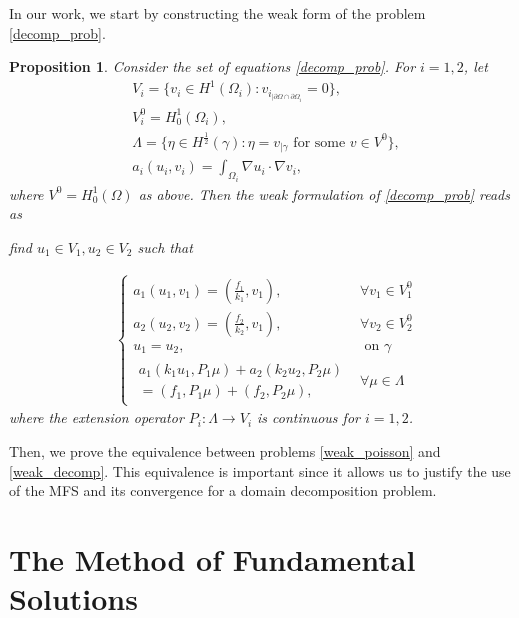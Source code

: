 \documentclass[5p,authoryear]{elsarticle}
\newtheorem{proposition}[theorem]{Proposition}
\begin{document}
In our work, we start by constructing the weak form of the problem \eqref{decomp_prob}.
\begin{proposition}
    Consider the set of equations \eqref{decomp_prob}. For \(i=1, 2\), let
    \begin{align*}
        &V_i = \{v_i \in H^1(\Omega_i): v_{i_{|\partial \Omega \cap \partial {\Omega_i}}}=0\},\\
        &V_i^0 = H^1_0(\Omega_i),\\
        &\Lambda = \{\eta \in H^\frac{1}{2}(\gamma): \eta = v_{|\gamma} \text{ for some } v \in V^0\}, \\
        &a_i (u_i, v_i) = \int_{\Omega_i} \nabla u_i \cdot \nabla v_i,
    \end{align*}
    where \(V^0 = H^1_0(\Omega)\) as above.
    Then the weak formulation of \eqref{decomp_prob} reads as
    \begin{center}
        \textit{find} \(u_1\in V_1, u_2 \in V_2\) \textit{such that}
    \end{center}
    \begin{equation}\label{weak_decomp}
        \begin{aligned}
            &\begin{cases}
                a_1(u_1, v_1) = (\frac{f_1}{k_1}, v_1), & \forall v_1 \in V_1^0\\
                a_2(u_2, v_2) = (\frac{f_2}{k_2}, v_1), & \forall v_2 \in V_2^0\\
                u_1 = u_2, & \text{ on } \gamma\\
                \begin{aligned}
                a_1(k_1 u_1, P_1 \mu) + a_2(k_2 u_2, P_2 \mu) \\[0.2cm] = (f_1, P_1 \mu)
                + (f_2, P_2 \mu),
                \end{aligned} & \forall \mu \in \Lambda
            \end{cases}
        \end{aligned}
        \end{equation}
    where the extension operator \(P_i: \Lambda \rightarrow V_i\) is continuous for \(i=1, 2\).
\end{proposition}

Then, we prove the equivalence between problems \eqref{weak_poisson} and \eqref{weak_decomp}. This equivalence is important since it allows us to justify the use of the MFS and its convergence for a domain decomposition problem.

\section{The Method of Fundamental Solutions}
\end{document}
